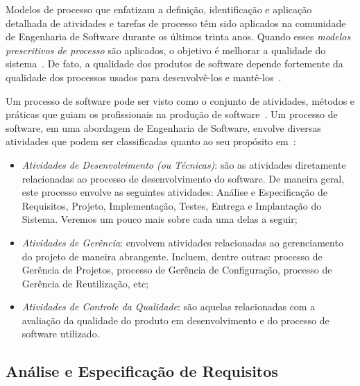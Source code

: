 Modelos de processo que enfatizam a definição, identificação e aplicação detalhada de atividades e tarefas de processo têm sido aplicados na comunidade de Engenharia de Software durante os últimos trinta anos. Quando esses \textit{modelos prescritivos de processo} são aplicados, o objetivo é melhorar a qualidade do sistema~\cite{presmannSoft}. 
De fato, a qualidade dos produtos de software depende fortemente da qualidade dos processos usados para desenvolvê-los e mantê-los~\cite{falboEngSoft}.

Um processo de software pode ser visto como o conjunto de atividades, métodos e práticas que guiam os profissionais na produção de software~\cite{falboEngSoft}. Um processo de software, em uma abordagem de Engenharia de Software, envolve diversas atividades que podem ser classificadas quanto ao seu propósito em~\cite{falboEngReq}:

\begin{itemize}
	\item \textit{Atividades de Desenvolvimento (ou Técnicas)}: são as atividades diretamente relacionadas ao processo de desenvolvimento do software. De maneira geral, este processo envolve as seguintes atividades: Análise e Especificação de Requisitos, Projeto, Implementação, Testes, Entrega e Implantação do Sistema. Veremos um pouco mais sobre cada uma delas a seguir;
	\item \textit{Atividades de Gerência}: envolvem atividades relacionadas ao gerenciamento do projeto de maneira abrangente. Incluem, dentre outras: processo de Gerência de Projetos, processo de Gerência de Configuração, processo de Gerência de Reutilização, etc;
	\item \textit{Atividades de Controle da Qualidade}: são aquelas relacionadas com a avaliação da qualidade do produto em desenvolvimento e do processo de software utilizado. 
\end{itemize}




\subsection{Análise e Especificação de Requisitos}
\label{sec-referencial-engenharia-software-atividade-desenvolvimento-analise-especificacao-requisisto}

